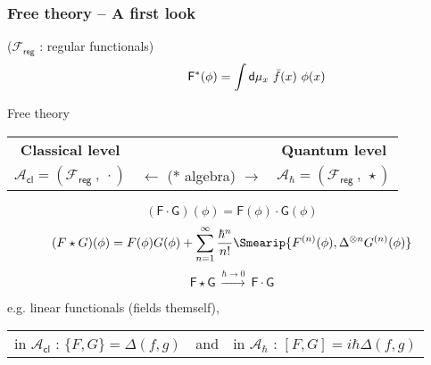\documentclass[9pt]{beamer}
\newcommand{\Acal}{\mathcal{A}}
\newcommand{\Fcal}{\mathcal{F}}
\newcommand{\Fsf}{\mathsf{F}}
\newcommand{\Gsf}{\mathsf{G}}
\newcommand{\dsf}{\mathsf{d}}
\begin{document}
\begin{frame}

\frametitle{Free theory -- A first look}
  
\vfill  
  
($\Fcal_\mathsf{reg}$ : regular functionals)
\vspace*{-27.5pt}
\begin{equation*}
\hspace*{40pt} \Fsf^\ast(\phi) = \int \dsf\mu_x \ \bar{f}(x) \ \phi(x) 
\end{equation*}

 
\vspace*{-8pt}

\begin{block}{\center \vspace*{-14pt} Free theory}
\vspace*{-6pt}
\begin{center}
% 
\begin{tabular}{ccc}
%
\textbf{Classical level} & & \textbf{Quantum level} \\
%
$\Acal_\mathsf{cl} = \left( \Fcal_{\mathsf{reg}} \ , \ \cdot \right)$ & $\leftarrow$ ($\ast$ algebra) $\rightarrow$ & $\Acal_\hbar = \left( \Fcal_{\mathsf{reg}} \ , \ \star \right)$ 
%
\end{tabular}
%
\begin{equation*}
(\Fsf \cdot \Gsf)(\phi) = \Fsf(\phi) \cdot \Gsf(\phi) 
\end{equation*}
%
\begin{equation*}
(F \star G)(\phi) = F(\phi) G(\phi) + \sum_{n=1}^\infty \frac{\hbar^n}{n!} \Smearip{F^{(n)}(\phi), \Delta^{\otimes n} G^{(n)}(\phi)} 
\end{equation*}
%
\begin{equation*}
\Fsf \star \Gsf \ \overset{\hbar \to 0}{\longrightarrow} \ \Fsf \cdot \Gsf
\end{equation*}
%
\end{center}
%
\end{block}

\vfill

e.g. linear functionals (fields themself), 
\begin{tabular}{lcl}
in $\Acal_\mathsf{cl}$ : $\{F,G\} = \Delta(f,g)$ & and & in $\Acal_\hbar$ : $[F,G] = i \hbar \Delta(f,g)$ 
\end{tabular}

\vfill

\end{frame}  
\end{document}
